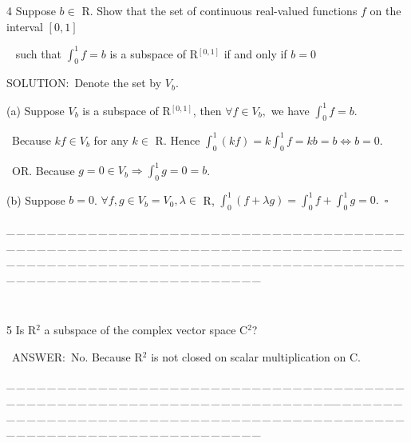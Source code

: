 \documentclass[a4paper, 11pt, UTF8]{article}
\begin{document}
\begin{large}
{\timesbf\Large 4} {\timessl\Large 
Suppose $b\in$ {\timesbf R}. Show that the set of continuous real-valued functions $f$ on the interval $[0,1]$}\par\,\,\,
{\timessl\Large such that $\int_0^1 f=b$ is a subspace of {\timesbf R}$^{[0,1]}$ if and only if $b=0$
}\par
{\timesbf S\footnotesize{OLUTION:}}\,\,\,Denote the set by $V_b$.\par\quad
(a) Suppose $V_b$ is a subspace of {\timesbf R}$^{[0,1]}$, then $\forall f\in V_b,$ we have $\int_0^1 f=b$.\par\qquad\,
Because $kf\in V_b$ for any $k\in$ {\timesbf R}. Hence $\int_0^1(kf)=k\int_0^1 f=kb=b\Leftrightarrow b=0$.\par\qquad\,
O{\small R}. Because $g=0\in V_b\Rightarrow\int_0^1 g=0=b$.\par\quad
(b) Suppose $b=0$. $\forall f,g\in V_b=V_0,\lambda\in$ {\timesbf R}, $\int_0^1(f+\lambda g)=\int_0^1 f+\int_0^1 g=0.\,\,\,\square$
\par
{\tiny \_\,\_\,\_\,\_\,\_\,\_\,\_\,\_\,\_\,\_\,\_\,\_\,\_\,\_\,\_\,\_\,\_\,\_\,\_\,\_\,\_\,\_\,\_\,\_\,\_\,\_\,\_\,\_\,\_\,\_\,\_\,\_\,\_\,\_\,\_\,\_\,\_\,\_\,\_\,\_\,\_\,\_\,\_\,\_\,\_\,\_\,\_\,\_\,\_\,\_\,\_\,\_\,\_\,\_\,\_\,\_\,\_\,\_\,\_\,\_\,\_\,\_\,\_\,\_\,\_\,\_\,\_\,\_\,\_\,\_\,\_\_\,\_\,\_\,\_\,\_\,\_\,\_\,\_\,\_\,\_\,\_\,\_\,\_\,\_\,\_\,\_\,\_\,\_\,\_\,\_\,\_\,\_\,\_\,\_\,\_\,\_\,\_\,\_\,\_\,\_\,\_\,\_\,\_\,\_\,\_\,\_\,\_\,\_\,\_\,\_\,\_\,\_\,\_\,\_\,\_\,\_\,\_\,\_\,\_\,\_\,\_\,\_\,\_\,\_\,\_\,\_\,\_\,\_\,\_\,\_\,\_\,\_\,\_\,\_\,\_\,\_\,\_\,\_\,\_\,\_\,\_}{\tiny\,\par}


{\timesbf\Large 5} {\timessl\Large 
Is  {\timesbf R}$^2$ a subspace of the complex vector space  {\timesbf C}$^2$?
}\par
\,\,\,{\timesbf A\small{NSWER:}}\,\,\,No. Because {\timesbf R}$^2$ is not closed on scalar multiplication on {\timesbf C}.\par
{\tiny \_\,\_\,\_\,\_\,\_\,\_\,\_\,\_\,\_\,\_\,\_\,\_\,\_\,\_\,\_\,\_\,\_\,\_\,\_\,\_\,\_\,\_\,\_\,\_\,\_\,\_\,\_\,\_\,\_\,\_\,\_\,\_\,\_\,\_\,\_\,\_\,\_\,\_\,\_\,\_\,\_\,\_\,\_\,\_\,\_\,\_\,\_\,\_\,\_\,\_\,\_\,\_\,\_\,\_\,\_\,\_\,\_\,\_\,\_\,\_\,\_\,\_\,\_\,\_\,\_\,\_\,\_\,\_\,\_\,\_\,\_\_\,\_\,\_\,\_\,\_\,\_\,\_\,\_\,\_\,\_\,\_\,\_\,\_\,\_\,\_\,\_\,\_\,\_\,\_\,\_\,\_\,\_\,\_\,\_\,\_\,\_\,\_\,\_\,\_\,\_\,\_\,\_\,\_\,\_\,\_\,\_\,\_\,\_\,\_\,\_\,\_\,\_\,\_\,\_\,\_\,\_\,\_\,\_\,\_\,\_\,\_\,\_\,\_\,\_\,\_\,\_\,\_\,\_\,\_\,\_\,\_\,\_\,\_\,\_\,\_\,\_\,\_\,\_\,\_\,\_\,\_}{\tiny\,\par}


\end{large}
\end{document}
